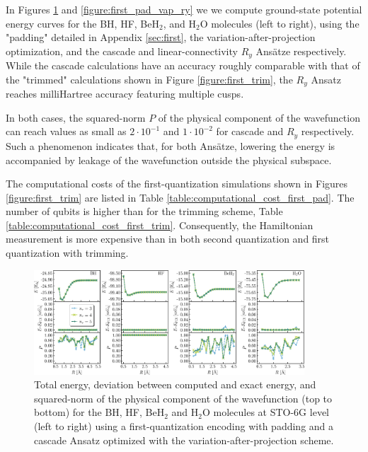 \documentclass[aps,pra,onecolumn]{revtex4-2}
\newcommand{\ry}{R_y}
\begin{document}
In Figures \ref{figure:first_pad_vap_cascade} and \ref{figure:first_pad_vap_ry} we we compute ground-state potential energy curves for the BH, HF, BeH$_2$, and H$_2$O molecules 
(left to right), using the "padding" detailed in Appendix \ref{sec:first}, the variation-after-projection optimization, and the cascade and linear-connectivity $\ry$ Ans\"{a}tze respectively.
While the cascade calculations have an accuracy roughly comparable with that of the "trimmed" calculations shown in Figure \ref{figure:first_trim},
the $\ry$ Ansatz reaches milliHartree accuracy featuring multiple cusps.

In both cases, the squared-norm $P$ of the physical component of the wavefunction can reach values as small as $2 \cdot 10^{-1}$ and $1 \cdot 10^{-2}$ for cascade and $\ry$ respectively.
Such a phenomenon indicates that, for both Ans\"{a}tze, lowering the energy is accompanied by leakage of the wavefunction outside the physical subspace.

The computational costs of the first-quantization simulations shown in Figures \ref{figure:first_trim} are listed in Table \ref{table:computational_cost_first_pad}.
The number of qubits is higher than for the trimming scheme, Table \ref{table:computational_cost_first_trim}. Consequently, the Hamiltonian measurement is 
more expensive than in both second quantization and first quantization with trimming.

\begin{figure}[t!]
\includegraphics[width=0.9\textwidth]{../figures/first_quantization_pad_vap_cascade/first_quantization_pad_vap_cascade.eps}
\caption{Total energy, deviation between computed and exact energy, and squared-norm of the physical component of the wavefunction
(top to bottom) for the BH, HF, BeH$_2$ and H$_2$O molecules at STO-6G level (left to right) 
using a first-quantization encoding with padding and a cascade Ansatz optimized with the variation-after-projection scheme.}
\label{figure:first_pad_vap_cascade}
\end{figure} 
\end{document}
